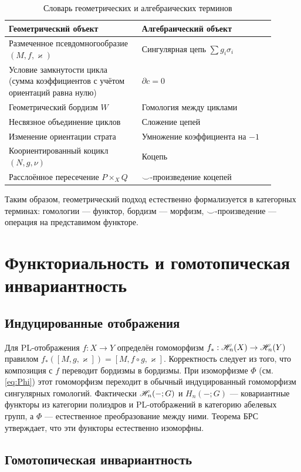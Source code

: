 \documentclass[12pt]{article}
\begin{document}
\begin{table}[htbp]
\centering
\begin{tabular}{p{0.45\linewidth}|p{0.45\linewidth}}
\textbf{Геометрический объект} & \textbf{Алгебраический объект} \\ \hline
Размеченное псевдомногообразие $(M,f,\varkappa)$ & Сингулярная цепь $\sum g_i \sigma_i$ \\
Условие замкнутости цикла (сумма коэффициентов с учётом ориентаций равна нулю) & $\partial c = 0$ \\
Геометрический бордизм $W$ & Гомология между циклами \\
Несвязное объединение циклов & Сложение цепей \\
Изменение ориентации страта & Умножение коэффициента на $-1$ \\
Коориентированный коцикл $(N,g,\nu)$ & Коцепь  \\
Расслоённое пересечение $P \times_X Q$ & $\smile$-произведение коцепей
\end{tabular}
\caption{Словарь геометрических и алгебраических терминов}\label{tab:dict}
\end{table}

Таким образом, геометрический подход естественно формализуется в категорных терминах: гомологии — функтор, бордизм — морфизм, $\smile$-произведение — операция на представимом функторе.

\section{Функториальность и гомотопическая инвариантность}

\subsection{Индуцированные отображения}

Для PL-отображения $f: X \to Y$ определён гомоморфизм $f_*: \mathscr{H}_n(X) \to \mathscr{H}_n(Y)$ правилом $f_*([M,g,\varkappa]) = [M, f \circ g, \varkappa]$. Корректность следует из того, что композиция с $f$ переводит бордизмы в бордизмы. При изоморфизме $\Phi$ (см. \cref{eq:Phi}) этот гомоморфизм переходит в обычный индуцированный гомоморфизм сингулярных гомологий. Фактически $\mathscr{H}_n(-;G)$ и $H_n(-;G)$ — ковариантные функторы из категории полиэдров и PL-отображений в категорию абелевых групп, а $\Phi$ — естественное преобразование между ними. Теорема БРС утверждает, что эти функторы естественно изоморфны.

\subsection{Гомотопическая инвариантность}
\end{document}
